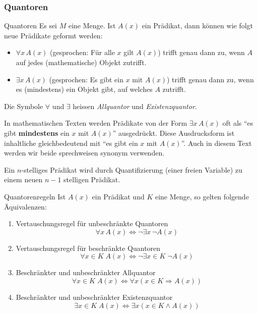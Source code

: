 \subsubsection{Quantoren}

\begin{concept}{Quantoren}
    Es sei $M$ eine Menge. Ist $A(x)$ ein Prädikat, dann können wie folgt neue Prädikate geformt werden:
    \begin{itemize}
        \item $\forall x\,A(x)$ (gesprochen: Für alle $x$ gilt $A(x)$) trifft genau dann zu, wenn $A$ auf jedes (mathematische) Objekt zutrifft.
        \item $\exists x\,A(x)$ (gesprochen: Es gibt ein $x$ mit $A(x)$) trifft genau dann zu, wenn es (mindestens) ein  Objekt gibt, auf welches $A$ zutrifft.
    \end{itemize}
    Die Symbole $\forall$ und $\exists$ heissen \textit{Allquantor} und \textit{Existenzquantor}.
\end{concept}

\begin{remark}
    In mathematischen Texten werden Prädikate von der Form $\exists x\,A(x)$ oft als ``es gibt \textbf{mindestens} ein $x$ mit $A(x)$'' ausgedrückt. Diese Ausdrucksform ist inhaltliche gleichbedeutend mit ``es gibt ein $x$ mit $A(x)$''. Auch in diesem Text werden wir beide sprechweisen synonym verwenden.
\end{remark}

\begin{remark}
    Ein $n$-stelliges Prädikat wird durch Quantifizierung (einer freien Variable) zu einem neuen $n-1$ stelligen Prädikat.
\end{remark}

\begin{lemma}{Quantorenregeln}
    Ist $A(x)$ ein Prädikat und $K$ eine Menge, so gelten folgende Äquivalenzen:
    \begin{enumerate}
        \item Vertauschungsregel für unbeschränkte Quantoren
            $$
                \forall x\, A(x)\Leftrightarrow \neg\exists x\,\neg A(x)
            $$
        \item Vertauschungsregel für beschränkte Quantoren
            $$
                \forall x\in K \;A(x)\Leftrightarrow \neg\exists x\in K\;\neg A(x)
            $$
        \item Beschränkter und unbeschränkter Allquantor
            $$
                \forall x\in K\;A(x)\Leftrightarrow \forall x(x\in K\Rightarrow A(x))
            $$
        \item Beschränkter und unbeschränkter Existenzquantor
            $$
                \exists x\in K\; A(x)\Leftrightarrow \exists x(x\in K\wedge A(x))
            $$
    \end{enumerate}
\end{lemma}

